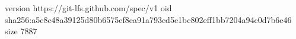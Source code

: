 version https://git-lfs.github.com/spec/v1
oid sha256:a5c8c48a39125d80b6575ef8ea91a793cd5e1bc802eff1bb7204a94c0d7b6e46
size 7887
